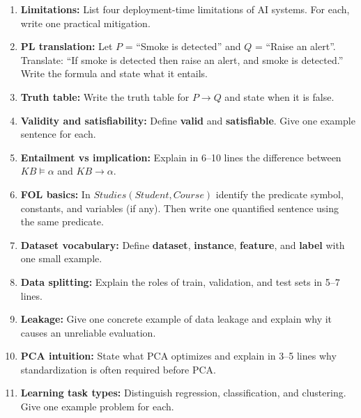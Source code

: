 \documentclass[11pt,a4paper]{article}
\begin{document}
\begin{enumerate}[label=E\arabic*., leftmargin=*]
  \item \textbf{Limitations:} List four deployment-time limitations of AI systems.
    For each, write one practical mitigation.

  \item \textbf{PL translation:} Let $P$ = ``Smoke is detected'' and $Q$ = ``Raise an alert''.
    Translate: ``If smoke is detected then raise an alert, and smoke is detected.''
    Write the formula and state what it entails.

  \item \textbf{Truth table:} Write the truth table for $P \rightarrow Q$ and state when it is false.

  \item \textbf{Validity and satisfiability:} Define \textbf{valid} and \textbf{satisfiable}.
    Give one example sentence for each.

  \item \textbf{Entailment vs implication:} Explain in 6--10 lines the difference between $KB \models \alpha$ and $KB \rightarrow \alpha$.

  \item \textbf{FOL basics:} In $Studies(Student, Course)$ identify the predicate symbol, constants, and variables (if any).
    Then write one quantified sentence using the same predicate.

  \item \textbf{Dataset vocabulary:} Define \textbf{dataset}, \textbf{instance}, \textbf{feature}, and \textbf{label}
    with one small example.

  \item \textbf{Data splitting:} Explain the roles of train, validation, and test sets in 5--7 lines.

  \item \textbf{Leakage:} Give one concrete example of data leakage and explain why it causes an unreliable evaluation.

  \item \textbf{PCA intuition:} State what PCA optimizes and explain in 3--5 lines why standardization is often required before PCA.

  \item \textbf{Learning task types:} Distinguish regression, classification, and clustering.
    Give one example problem for each.
\end{enumerate}
\end{document}
